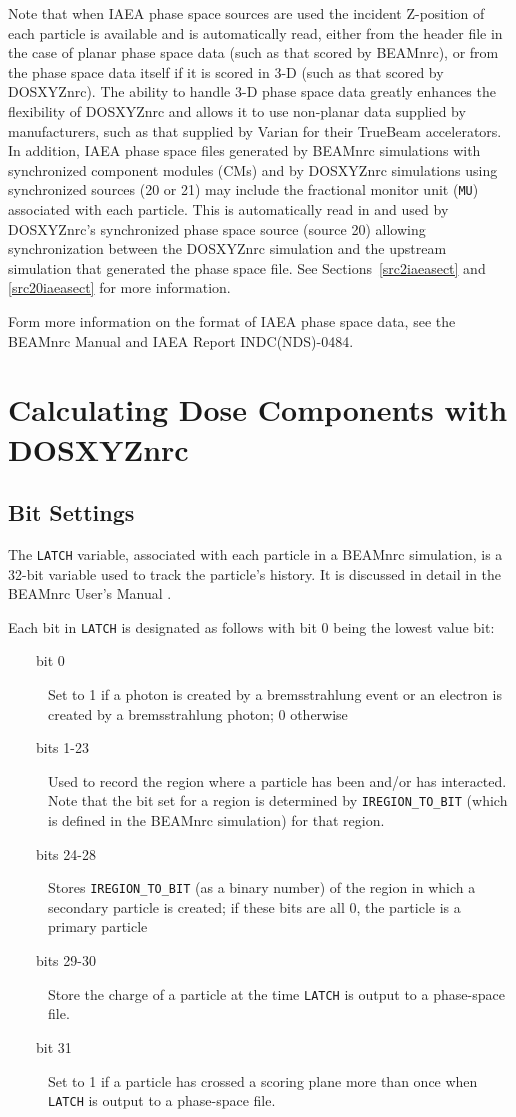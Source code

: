 \documentclass[12pt,twoside]{article}      %
\newcommand{\indexm}[1]{\index{#1}}
\begin{document}
Note that when IAEA phase space sources are used the incident Z-position of each particle
is available and is automatically read, either from the header file in the case of
planar phase space data (such as that scored by BEAMnrc), or from the phase space
data itself if it is scored in 3-D (such as that scored by DOSXYZnrc).  The ability to handle
3-D phase space data greatly enhances the flexibility of DOSXYZnrc and allows it to
use non-planar data supplied by manufacturers, such as that supplied by Varian for
their TrueBeam accelerators.  In addition, IAEA phase space files generated by BEAMnrc simulations
with synchronized component modules (CMs) and by DOSXYZnrc simulations using synchronized
sources (20 or 21) may include the fractional monitor unit ({\tt MU}) associated with each particle.
This is automatically read in and used by DOSXYZnrc's synchronized phase space source (source 20) allowing
synchronization between the DOSXYZnrc simulation and the upstream simulation that generated the phase
space file.  See Sections~\ref{src2iaeasect} and \ref{src20iaeasect} for more information.

Form more information on the format of IAEA phase space data, see the
BEAMnrc Manual and IAEA Report INDC(NDS)-0484\cite{CJ05}.

\section{Calculating Dose Components with DOSXYZnrc}
\label{bitfiltersec}
\subsection{Bit Settings}
\indexm{bit setting}

\indexm{LATCH}
The {\tt LATCH} variable, associated with each particle in a
BEAMnrc simulation, is a
32-bit variable used to track the particle's history.  It is discussed in
detail in the BEAMnrc User's Manual \cite{Ro04a}.

Each bit in {\tt LATCH} is designated as follows with bit 0 being the lowest value bit:
\begin{description}
\item [~~~~bit 0] Set to 1 if a photon is created by a bremsstrahlung event or an electron is created by a bremsstrahlung photon; 0
otherwise
\item [~~~~bits 1-23] Used to record the region where a particle has been and/or
has interacted. Note that the bit set for a region is determined by
{\tt IREGION\_TO\_BIT} (which is defined in the BEAMnrc simulation)
for that region.
\item [~~~~bits 24-28] Stores {\tt IREGION\_TO\_BIT} (as a binary number) of the
region in which a secondary particle
is created; if these bits are all 0, the particle is a primary
particle
\item [~~~~bits 29-30] Store the charge of a particle at the time {\tt LATCH} is output
\indexm{LATCH}
to a phase-space file.
\item [~~~~bit 31] Set to 1 if a particle has crossed a scoring plane
more than once when {\tt LATCH} is output to a phase-space file.
\indexm{LATCH}

\end{description}
\end{document}
